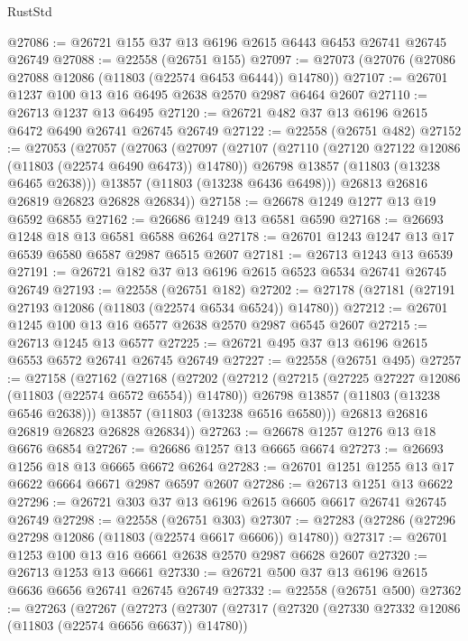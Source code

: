 \begin{lexlean}{RustStd}
\begin{coremodule}
@27086 := @26721 @155 @37 @13 @6196 @2615 @6443 @6453 @26741 @26745 @26749
@27088 := @22558 (@26751 @155)
@27097 := @27073 (@27076 (@27086 @27088 @12086 (@11803 (@22574 @6453 @6444)) @14780))
@27107 := @26701 @1237 @100 @13 @16 @6495 @2638 @2570 @2987 @6464 @2607
@27110 := @26713 @1237 @13 @6495
@27120 := @26721 @482 @37 @13 @6196 @2615 @6472 @6490 @26741 @26745 @26749
@27122 := @22558 (@26751 @482)
@27152 := @27053
    (@27057
      (@27063
        (@27097
          (@27107
            (@27110 (@27120 @27122 @12086 (@11803 (@22574 @6490 @6473)) @14780))
            @26798
            @13857
            (@11803 (@13238 @6465 @2638)))
          @13857
          (@11803 (@13238 @6436 @6498)))
        @26813
        @26816
        @26819
        @26823
        @26828
        @26834))
@27158 := @26678 @1249 @1277 @13 @19 @6592 @6855
@27162 := @26686 @1249 @13 @6581 @6590
@27168 := @26693 @1248 @18 @13 @6581 @6588 @6264
@27178 := @26701 @1243 @1247 @13 @17 @6539 @6580 @6587 @2987 @6515 @2607
@27181 := @26713 @1243 @13 @6539
@27191 := @26721 @182 @37 @13 @6196 @2615 @6523 @6534 @26741 @26745 @26749
@27193 := @22558 (@26751 @182)
@27202 := @27178 (@27181 (@27191 @27193 @12086 (@11803 (@22574 @6534 @6524)) @14780))
@27212 := @26701 @1245 @100 @13 @16 @6577 @2638 @2570 @2987 @6545 @2607
@27215 := @26713 @1245 @13 @6577
@27225 := @26721 @495 @37 @13 @6196 @2615 @6553 @6572 @26741 @26745 @26749
@27227 := @22558 (@26751 @495)
@27257 := @27158
    (@27162
      (@27168
        (@27202
          (@27212
            (@27215 (@27225 @27227 @12086 (@11803 (@22574 @6572 @6554)) @14780))
            @26798
            @13857
            (@11803 (@13238 @6546 @2638)))
          @13857
          (@11803 (@13238 @6516 @6580)))
        @26813
        @26816
        @26819
        @26823
        @26828
        @26834))
@27263 := @26678 @1257 @1276 @13 @18 @6676 @6854
@27267 := @26686 @1257 @13 @6665 @6674
@27273 := @26693 @1256 @18 @13 @6665 @6672 @6264
@27283 := @26701 @1251 @1255 @13 @17 @6622 @6664 @6671 @2987 @6597 @2607
@27286 := @26713 @1251 @13 @6622
@27296 := @26721 @303 @37 @13 @6196 @2615 @6605 @6617 @26741 @26745 @26749
@27298 := @22558 (@26751 @303)
@27307 := @27283 (@27286 (@27296 @27298 @12086 (@11803 (@22574 @6617 @6606)) @14780))
@27317 := @26701 @1253 @100 @13 @16 @6661 @2638 @2570 @2987 @6628 @2607
@27320 := @26713 @1253 @13 @6661
@27330 := @26721 @500 @37 @13 @6196 @2615 @6636 @6656 @26741 @26745 @26749
@27332 := @22558 (@26751 @500)
@27362 := @27263
    (@27267
      (@27273
        (@27307
          (@27317
            (@27320 (@27330 @27332 @12086 (@11803 (@22574 @6656 @6637)) @14780))

\end{coremodule}
\end{lexlean}
